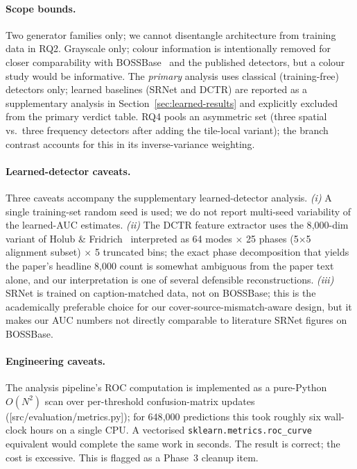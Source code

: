 \documentclass[10pt,twocolumn,a4paper]{article}
\begin{document}
\paragraph{Scope bounds.} Two generator families only; we cannot disentangle architecture from training data in RQ2. Grayscale only; colour information is intentionally removed for closer comparability with BOSSBase~\cite{bas2011boss} and the published detectors, but a colour study would be informative. The \emph{primary} analysis uses classical (training-free) detectors only; learned baselines (SRNet and DCTR) are reported as a supplementary analysis in Section~\ref{sec:learned-results} and explicitly excluded from the primary verdict table. RQ4 pools an asymmetric set (three spatial vs.\ three frequency detectors after adding the tile-local variant); the branch contrast accounts for this in its inverse-variance weighting.

\paragraph{Learned-detector caveats.} Three caveats accompany the supplementary learned-detector analysis. \textit{(i)} A single training-set random seed is used; we do not report multi-seed variability of the learned-AUC estimates. \textit{(ii)} The DCTR feature extractor uses the 8{,}000-dim variant of Holub \& Fridrich~\cite{holub2015dctr} interpreted as 64 modes $\times$ 25 phases (5$\times$5 alignment subset) $\times$ 5 truncated bins; the exact phase decomposition that yields the paper's headline 8{,}000 count is somewhat ambiguous from the paper text alone, and our interpretation is one of several defensible reconstructions. \textit{(iii)} SRNet is trained on caption-matched data, not on BOSSBase; this is the academically preferable choice for our cover-source-mismatch-aware design, but it makes our AUC numbers not directly comparable to literature SRNet figures on BOSSBase.

\paragraph{Engineering caveats.} The analysis pipeline's ROC computation is implemented as a pure-Python $O(N^2)$ scan over per-threshold confusion-matrix updates ([src/evaluation/metrics.py]); for 648{,}000 predictions this took roughly six wall-clock hours on a single CPU. A vectorised \texttt{sklearn.metrics.roc\_curve} equivalent would complete the same work in seconds. The result is correct; the cost is excessive. This is flagged as a Phase~3 cleanup item.
\end{document}
